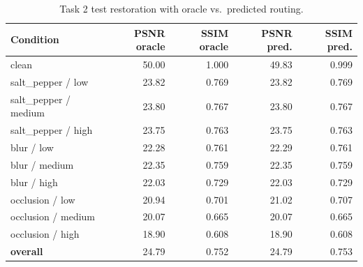 \begin{table}[t]
\centering
\caption{Task 2 test restoration with oracle vs.\ predicted routing.}
\label{tab:t2_rest}
\footnotesize
\begin{tabular}{lrrrr}
\toprule
Condition & PSNR oracle & SSIM oracle & PSNR pred. & SSIM pred. \\
\midrule
clean & 50.00 & 1.000 & 49.83 & 0.999 \\
salt\_pepper / low & 23.82 & 0.769 & 23.82 & 0.769 \\
salt\_pepper / medium & 23.80 & 0.767 & 23.80 & 0.767 \\
salt\_pepper / high & 23.75 & 0.763 & 23.75 & 0.763 \\
blur / low & 22.28 & 0.761 & 22.29 & 0.761 \\
blur / medium & 22.35 & 0.759 & 22.35 & 0.759 \\
blur / high & 22.03 & 0.729 & 22.03 & 0.729 \\
occlusion / low & 20.94 & 0.701 & 21.02 & 0.707 \\
occlusion / medium & 20.07 & 0.665 & 20.07 & 0.665 \\
occlusion / high & 18.90 & 0.608 & 18.90 & 0.608 \\
\textbf{overall} & 24.79 & 0.752 & 24.79 & 0.753 \\
\bottomrule
\end{tabular}
\end{table}
